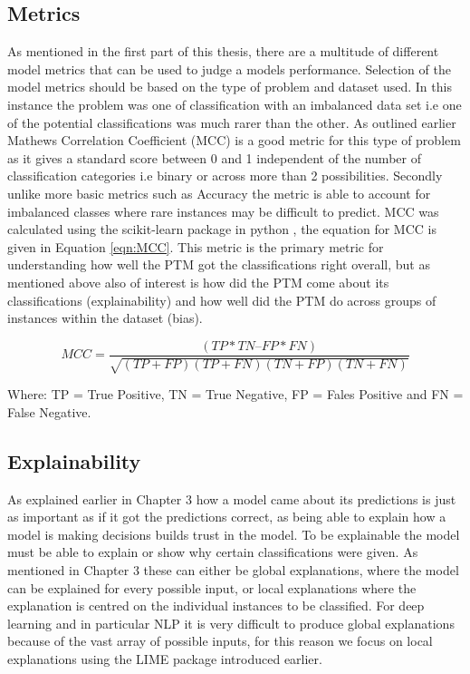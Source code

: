 \subsection{Metrics} As mentioned in the first part of this thesis, there are a multitude of different model metrics that can be used to judge a models performance. Selection of the model metrics should be based on the type of problem and dataset used. In this instance the problem was one of classification with an imbalanced data set i.e one of the potential classifications was much rarer than the other. As outlined earlier Mathews Correlation Coefficient (MCC) is a good metric for this type of problem as it gives a standard score between 0 and 1 independent of the number of classification categories i.e binary or across more than 2 possibilities. Secondly unlike more basic metrics such as Accuracy the metric is able to account for imbalanced classes where rare instances may be difficult to predict. MCC was calculated using the scikit-learn package in python \parencite{scikit-learn}, the equation for MCC is given in Equation \ref{eqn:MCC}. This metric is the primary metric for understanding how well the PTM got the classifications right overall, but as mentioned above also of interest is how did the PTM come about its classifications (explainability) and how well did the PTM do across groups of instances within the dataset (bias). 

\begin{equation}
MCC =  \frac{(TP*TN – FP*FN)}{\sqrt{(TP+FP)(TP+FN)(TN+FP)(TN+FN)}}
\label{eqn:MCC}
\end{equation}

Where: TP = True Positive, TN = True Negative, FP = Fales Positive and FN = False Negative.


\subsection{Explainability}As explained earlier in Chapter 3 how a model came about its predictions is just as important as if it got the predictions correct, as being able to explain how a model is making decisions builds trust in the model. To be explainable the model must be able to explain or show why certain classifications were given. As mentioned in Chapter 3 these can either be global explanations, where the model can be explained for every possible input, or local explanations where the explanation is centred on the individual instances to be classified. For deep learning and in particular NLP it is very difficult to produce global explanations because of the vast array of possible inputs, for this reason we focus on local explanations using the LIME package introduced earlier. 

